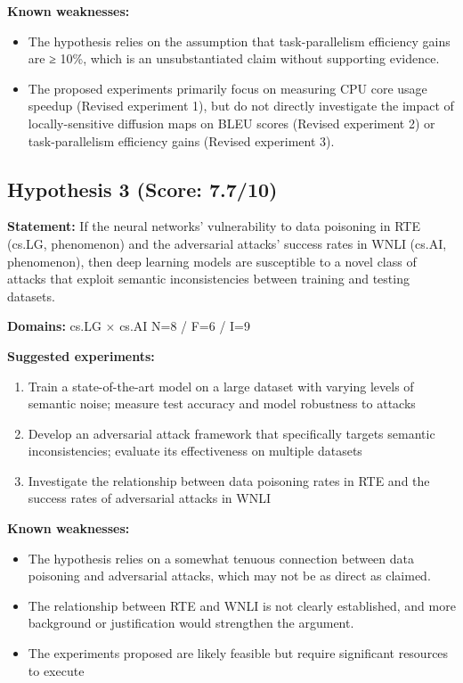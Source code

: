 \documentclass[12pt,a4paper]{article}
\begin{document}
\textbf{Known weaknesses:}
\begin{itemize}
  \item The hypothesis relies on the assumption that task-parallelism efficiency gains are ≥ 10\%, which is an unsubstantiated claim without supporting evidence.
  \item The proposed experiments primarily focus on measuring CPU core usage speedup (Revised experiment 1), but do not directly investigate the impact of locally-sensitive diffusion maps on BLEU scores (Revised experiment 2) or task-parallelism efficiency gains (Revised experiment 3).
\end{itemize}
\subsection*{Hypothesis 3 (Score: 7.7/10)}

\textbf{Statement:} If the neural networks' vulnerability to data poisoning in RTE (cs.LG, phenomenon) and the adversarial attacks' success rates in WNLI (cs.AI, phenomenon), then deep learning models are susceptible to a novel class of attacks that exploit semantic inconsistencies between training and testing datasets.

\noindent\textbf{Domains:} cs.LG $\times$ cs.AI
\hspace{1em} N=8 / F=6 / I=9

\textbf{Suggested experiments:}
\begin{enumerate}
  \item Train a state-of-the-art model on a large dataset with varying levels of semantic noise; measure test accuracy and model robustness to attacks
  \item Develop an adversarial attack framework that specifically targets semantic inconsistencies; evaluate its effectiveness on multiple datasets
  \item Investigate the relationship between data poisoning rates in RTE and the success rates of adversarial attacks in WNLI
\end{enumerate}

\textbf{Known weaknesses:}
\begin{itemize}
  \item The hypothesis relies on a somewhat tenuous connection between data poisoning and adversarial attacks, which may not be as direct as claimed.
  \item The relationship between RTE and WNLI is not clearly established, and more background or justification would strengthen the argument.
  \item The experiments proposed are likely feasible but require significant resources to execute
\end{itemize}
\end{document}
